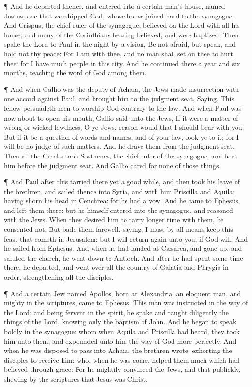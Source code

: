  ¶ And he departed thence, and entered into a certain man's
house, named Justus, one that worshipped God, whose house joined hard to
the synagogue.  And Crispus, the chief ruler of the
synagogue, believed on the Lord with all his house; and many of the
Corinthians hearing believed, and were baptized.  Then spake
the Lord to Paul in the night by a vision, Be not afraid, but speak, and
hold not thy peace:  For I am with thee, and no man shall
set on thee to hurt thee: for I have much people in this city.
 And he continued there a year and six months, teaching the
word of God among them.

 ¶ And when Gallio was the deputy of Achaia, the Jews made
insurrection with one accord against Paul, and brought him to the
judgment seat,  Saying, This fellow persuadeth men to
worship God contrary to the law.  And when Paul was now
about to open his mouth, Gallio said unto the Jews, If it were a matter
of wrong or wicked lewdness, O ye Jews, reason would that I should bear
with you:  But if it be a question of words and names, and
of your law, look ye to it; for I will be no judge of such matters.
 And he drave them from the judgment seat. 
Then all the Greeks took Sosthenes, the chief ruler of the synagogue,
and beat him before the judgment seat. And Gallio cared for none of
those things.

 ¶ And Paul after this tarried there yet a good while, and
then took his leave of the brethren, and sailed thence into Syria, and
with him Priscilla and Aquila; having shorn his head in Cenchrea: for he
had a vow.  And he came to Ephesus, and left them there:
but he himself entered into the synagogue, and reasoned with the Jews.
 When they desired him to tarry longer time with them, he
consented not;  But bade them farewell, saying, I must by
all means keep this feast that cometh in Jerusalem: but I will return
again unto you, if God will. And he sailed from Ephesus. 
And when he had landed at Cæsarea, and gone up, and saluted the church,
he went down to Antioch.  And after he had spent some time
there, he departed, and went over all the country of Galatia and Phrygia
in order, strengthening all the disciples.

 ¶ And a certain Jew named Apollos, born at Alexandria, an
eloquent man, and mighty in the scriptures, came to Ephesus.
 This man was instructed in the way of the Lord; and being
fervent in the spirit, he spake and taught diligently the things of the
Lord, knowing only the baptism of John.  And he began to
speak boldly in the synagogue: whom when Aquila and Priscilla had heard,
they took him unto them, and expounded unto him the way of God more
perfectly.  And when he was disposed to pass into Achaia,
the brethren wrote, exhorting the disciples to receive him: who, when he
was come, helped them much which had believed through grace:
 For he mightily convinced the Jews, and that publickly,
shewing by the scriptures that Jesus was Christ.

